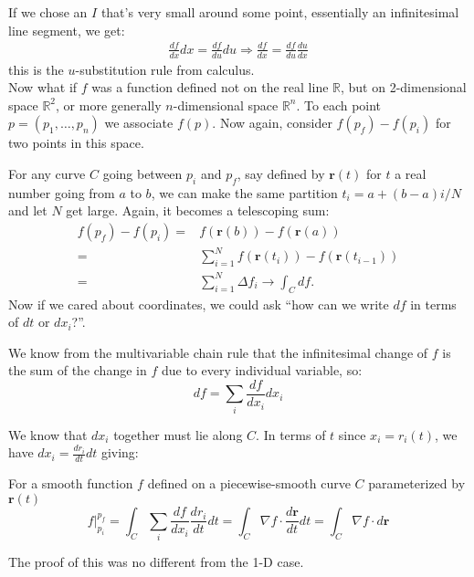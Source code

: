 \documentclass[../master.tex]{subfiles}
\begin{document}
	If we chose an $I$ that's very small around some point, essentially an infinitesimal line segment, we get:
	\begin{align*}
		\frac{df}{dx} dx =  \frac{df}{du} du \Rightarrow \frac{df}{dx} = \frac{df}{du} \frac{du}{dx}
	\end{align*}
	this is the $u$-substitution rule from calculus.
	\\

	
	Now what if $f$ was a function defined not on the real line $\mathbb{R}$, but on 2-dimensional space $\mathbb{R}^2$, or more generally $n$-dimensional space $\mathbb{R}^n$. To each point $p = (p_1, \dots, p_n)$ we associate $f(p)$. Now again, consider $f(p_f)-f(p_i)$ for two points in this space.
	
	For any curve $C$ going between $p_i$ and $p_f$, say defined by $\mathbf r(t)$ for $t$ a real number going from $a$ to $b$, we can make the same partition $t_i = a + (b-a)i/N$ and let $N$ get large. Again, it becomes a telescoping sum:
	\begin{align*}
		f(p_f) - f(p_i) = &f(\mathbf r(b)) - f(\mathbf r(a)) \\= & \sum_{i=1}^N f(\mathbf r(t_{i}))-f(\mathbf r(t_{i-1})) \\ = & \sum_{i=1}^N \Delta f_i  \rightarrow \int_C df.
	\end{align*}
	Now if we cared about coordinates, we could ask ``how can we write $df$ in terms of $dt$ or $dx_i$?''. 
	
	We know from the multivariable chain rule that the infinitesimal change of $f$ is the sum of the change in $f$ due to every individual variable, so: 
	\begin{equation}
		df = \sum_i \frac{df}{dx_i} dx_i
	\end{equation}

	We know that $dx_i$ together must lie along $C$. In terms of $t$ since $x_i = r_i (t)$, we have $dx_i = \frac{dr_i}{dt} dt$ giving:
	\begin{theorem}
	For a smooth function $f$ defined on a piecewise-smooth curve $C$ parameterized by $\mathbf r(t)$
		\begin{equation}
			f\rvert^{p_f}_{p_i} = \int_C \sum_i \frac{df}{dx_i} \frac{dr_i}{dt} dt = \int_C \nabla f \cdot \frac{d \mathbf r}{dt} dt =  \int_C \nabla f \cdot d \mathbf r
		\end{equation}
	\end{theorem}
	The proof of this was no different from the 1-D case.\\
	
\end{document}
